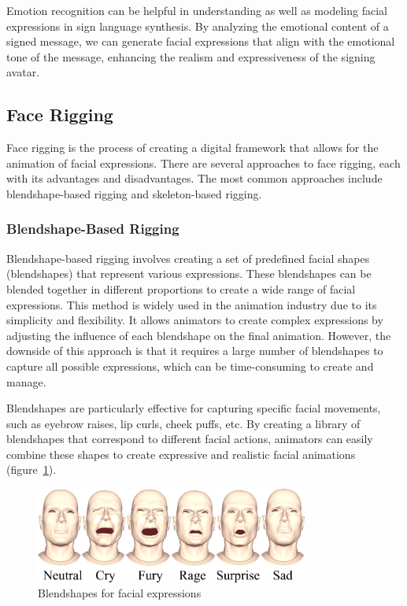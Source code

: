 \documentclass[../../main.tex]{subfiles}
\begin{document}
Emotion recognition can be helpful in understanding as well as modeling facial expressions in sign language synthesis. By analyzing the emotional content of a signed message, we can generate facial expressions that align with the emotional tone of the message, enhancing the realism and expressiveness of the signing avatar.

\subsection{Face Rigging}
\label{ch:facial_expressions:related_work:face_rigging}

Face rigging is the process of creating a digital framework that allows for the animation of facial expressions. There are several approaches to face rigging, each with its advantages and disadvantages. The most common approaches include blendshape-based rigging and skeleton-based rigging.

\subsubsection{Blendshape-Based Rigging}
\label{ch:facial_expressions:related_work:face_rigging:blendshape_based_rigging}

Blendshape-based rigging involves creating a set of predefined facial shapes (blendshapes) that represent various expressions. These blendshapes can be blended together in different proportions to create a wide range of facial expressions. This method is widely used in the animation industry due to its simplicity and flexibility. It allows animators to create complex expressions by adjusting the influence of each blendshape on the final animation. However, the downside of this approach is that it requires a large number of blendshapes to capture all possible expressions, which can be time-consuming to create and manage.

Blendshapes are particularly effective for capturing specific facial movements, such as eyebrow raises, lip curls, cheek puffs, etc. By creating a library of blendshapes that correspond to different facial actions, animators can easily combine these shapes to create expressive and realistic facial animations (figure~\ref{ch:facial_expressions:fig:blendshapes}).

\begin{figure}
    \centering
    \includegraphics[width=0.8\textwidth]{chapters/facial_expressions/images/blendshapes.png}
    \caption{Blendshapes for facial expressions}
    \label{ch:facial_expressions:fig:blendshapes}
\end{figure}
\end{document}
